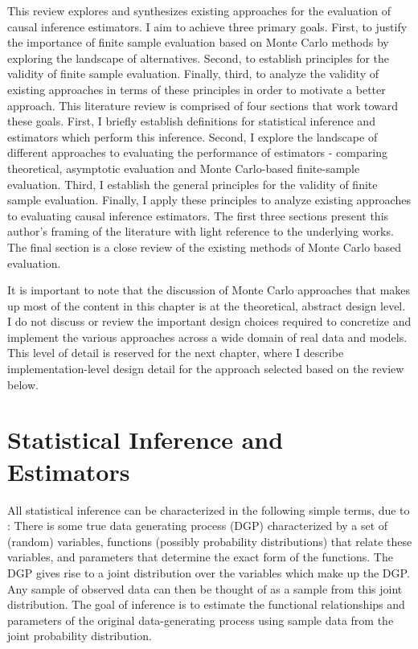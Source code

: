 \documentclass[../main.tex]{subfiles}
\begin{document}

This review explores and synthesizes existing approaches for the evaluation of causal inference estimators. I aim to achieve three primary goals. First, to justify the importance of finite sample evaluation based on Monte Carlo methods by exploring the landscape of alternatives. Second, to establish principles for the validity of finite sample evaluation. Finally, third, to analyze the validity of existing approaches in terms of these principles in order to motivate a better approach. This literature review is comprised of four sections that work toward these goals. First, I briefly establish definitions for statistical inference and estimators which perform this inference. Second, I explore the landscape of different approaches to evaluating the performance of estimators - comparing theoretical, asymptotic evaluation and Monte Carlo-based finite-sample evaluation. Third, I establish the general principles for the validity of finite sample evaluation. Finally, I apply these principles to analyze existing approaches to evaluating causal inference estimators. The first three sections present this author’s framing of the literature with light reference to the underlying works. The final section is a close review of the existing methods of Monte Carlo based evaluation.

\vspace{\baselineskip}

It is important to note that the discussion of Monte Carlo approaches that makes up most of the content in this chapter is at the theoretical, abstract design level. I do not discuss or review the important design choices required to concretize and implement the various approaches across a wide domain of real data and models. This level of detail is reserved for the next chapter, where I describe implementation-level design detail for the approach selected based on the review below.

\section{Statistical Inference and Estimators}

\vspace{\baselineskip}
All statistical inference can be characterized in the following simple terms, due to \textcite{Pearl2009CausalOverview}: There is some true data generating process (DGP) characterized by a set of (random) variables, functions (possibly probability distributions) that relate these variables, and parameters that determine the exact form of the functions. The DGP gives rise to a joint distribution over the variables which make up the DGP. Any sample of observed data can then be thought of as a sample from this joint distribution. The goal of inference is to estimate the functional relationships and parameters of the original data-generating process using sample data from the joint probability distribution.\par
\end{document}
